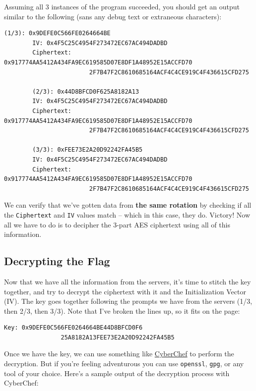 \documentclass[11pt]{article}
\begin{document}
    Assuming all 3 instances of the program succeeded, you should get an output similar to the following (sans any debug text or extraneous characters):

    \begin{lstlisting}[gobble=8,label={lst:server-output}]
        (1/3): 0x9DEFE0C566FE0264664BE
        IV: 0x4F5C25C4954F273472EC67AC494DADBD
        Ciphertext: 0x917774AA5412A434FA9EC619585D07E8DF1A48952E15ACCFD70
                        2F7B47F2C8610685164ACF4C4CE919C4F436615CFD275

        (2/3): 0x44D8BFCD0F625A8182A13
        IV: 0x4F5C25C4954F273472EC67AC494DADBD
        Ciphertext: 0x917774AA5412A434FA9EC619585D07E8DF1A48952E15ACCFD70
                        2F7B47F2C8610685164ACF4C4CE919C4F436615CFD275

        (3/3): 0xFEE73E2A20D92242FA45B5
        IV: 0x4F5C25C4954F273472EC67AC494DADBD
        Ciphertext: 0x917774AA5412A434FA9EC619585D07E8DF1A48952E15ACCFD70
                        2F7B47F2C8610685164ACF4C4CE919C4F436615CFD275
    \end{lstlisting}

    We can verify that we've gotten data from \textbf{the same rotation} by checking if all the \verb`Ciphertext` and \verb`IV` values match -- which in this case, they do. Victory! Now all we have to do is to decipher the 3-part AES ciphertext using all of this information.

    \subsection{Decrypting the Flag}\label{subsec:decrypting-the-flag}

    Now that we have all the information from the servers, it's time to stitch the key together, and try to decrypt the ciphertext with it and the Initialization Vector (IV). The key goes together following the prompts we have from the servers (1/3, then 2/3, then 3/3). Note that I've broken the lines up, so it fits on the page:

    \begin{lstlisting}[gobble=8,label={lst:aes-key}]
        Key: 0x9DEFE0C566FE0264664BE44D8BFCD0F6
                25A8182A13FEE73E2A20D92242FA45B5
    \end{lstlisting}

    \pagebreak

    Once we have the key, we can use something like \href{https://gchq.github.io/CyberChef}{CyberChef} to perform the decryption. But if you're feeling adventurous you can use \verb`openssl`, \verb`gpg`, or any tool of your choice. Here's a sample output of the decryption process with CyberChef:
\end{document}
